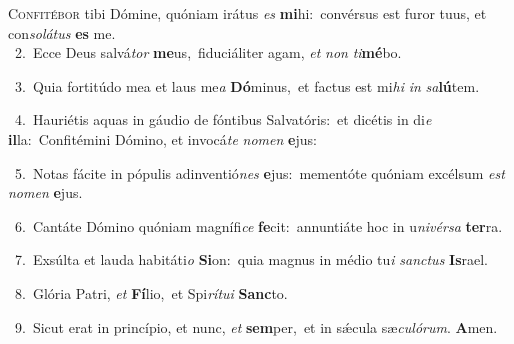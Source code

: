 \lettrine{\initial\textcolor{\initialcolor}{C}}{onfitébor} tibi Dómine, quóniam irátus \textit{es} \textbf{mi}\-hi:~\star convérsus est furor tuus, et con\-\textit{so}\-\textit{lá}\textit{tus} \textbf{es} me.\\
{\numbfont\textcolor{\numbcolor}{~2.}}~Ecce Deus salvá\textit{tor} \textbf{me}\-us,~\star fiduciáliter agam, \textit{et} \textit{non} \textit{ti}\-\textbf{mé}bo.\par
{\numbfont\textcolor{\numbcolor}{~3.}}~Quia fortitúdo mea et laus me\textit{a} \textbf{Dó}\-minus,~\star et factus est mi\textit{hi} \textit{in} \textit{sa}\-\textbf{lú}tem.\par
{\numbfont\textcolor{\numbcolor}{~4.}}~Hauriétis aquas in gáudio de fóntibus Salvatóris:~\dagger et dicétis in di\textit{e} \textbf{il}\-la:~\star Confitémini Dómino, et invocá\textit{te} \textit{no}\-\textit{men} \textbf{e}\-jus:\par
{\numbfont\textcolor{\numbcolor}{~5.}}~Notas fácite in pópulis adinventió\textit{nes} \textbf{e}\-jus:~\star mementóte quóniam excélsum \textit{est} \textit{no}\-\textit{men} \textbf{e}\-jus.\par
{\numbfont\textcolor{\numbcolor}{~6.}}~Cantáte Dómino quóniam magnífi\textit{ce} \textbf{fe}\-cit:~\star annuntiáte hoc in u\-\textit{ni}\-\textit{vér}\textit{sa} \textbf{ter}\-ra.\par
{\numbfont\textcolor{\numbcolor}{~7.}}~Exsúlta et lauda habitáti\textit{o} \textbf{Si}\-on:~\star quia magnus in médio tu\textit{i} \textit{sanc}\-\textit{tus} \textbf{Is}\-rael.\par
{\numbfont\textcolor{\numbcolor}{~8.}}~Glória Patri, \textit{et} \textbf{Fí}\-lio,~\star et Spi\-\textit{rí}\-\textit{tu}\textit{i} \textbf{Sanc}\-to.\par
{\numbfont\textcolor{\numbcolor}{~9.}}~Sicut erat in princípio, et nunc, \textit{et} \textbf{sem}\-per,~\star et in sǽcula sæ\-\textit{cu}\-\textit{ló}\textit{rum}. \textbf{A}\-men.\par
